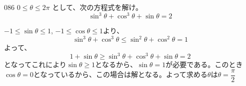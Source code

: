 \begin{thm}{086}{}{}
 $0 \le \theta \le 2\pi$ として、次の方程式を解け。 \\
 \[ \sin^3\theta+\cos^3\theta+\sin\theta=2 \]
\end{thm}

$-1\le\sin\theta\le 1$, $-1\le\cos\theta\le 1$より、
\[ \sin^3\theta+\cos^3\theta\le\sin^2\theta+\cos^2\theta=1 \]
よって、
\[ 1+\sin\theta \ge \sin^3\theta+\cos^3\theta+\sin\theta=2 \]
となってこれにより$\sin\theta\ge 1$となるから、$\sin\theta=1$が必要である。このとき$\cos\theta=0$となっているから、この場合は解となる。よって求める$\theta$は$\theta=\dfrac{\pi}{2}$